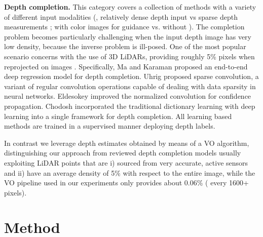 \documentclass[10pt,twocolumn,letterpaper]{article}
\begin{document}
\textbf{Depth completion.} This category covers a collection of methods with a variety of different input modalities (\eg, relatively dense depth input \cite{Shen_2013_ICCV_Workshops} vs sparse depth measurements \cite{Ma2017SparseToDense}; with color images for guidance \cite{Ma2017SparseToDense} vs. without \cite{sparse_conv}). 
The completion problem becomes particularly challenging when the input depth image has very low density, because the inverse problem is ill-posed. One of the most popular scenario concerns with the use of 3D LiDARs, providing roughly 5\% pixels when reprojected on images \cite{sparse_conv}. Specifically, Ma and Karaman \cite{Ma2017SparseToDense} proposed an end-to-end deep regression model for depth completion. Uhrig \etal \cite{sparse_conv} proposed sparse convolution, a variant
of regular convolution operations capable of dealing with data sparsity in neural networks. Eldesokey \etal \cite{eldesokey2018propagating} improved the normalized convolution for confidence propagation. Chodosh \etal \cite{Chodosh_ACCV_2018} incorporated the traditional dictionary learning with deep learning into a single framework for depth completion. All learning based methods \cite{Ma2017SparseToDense,sparse_conv,eldesokey2018propagating,Chodosh_ACCV_2018} are trained in a supervised manner deploying depth labels.

In contrast we leverage depth estimates obtained by means of a VO algorithm, distinguishing our approach from reviewed depth completion models usually exploiting LiDAR points that are i) sourced from very accurate, active sensors and ii) have an average density of 5\% with respect to the entire image, while the VO pipeline used in our experiments only provides about 0.06\% ( every 1600+ pixels). \section{Method}
\label{Method}
\end{document}
